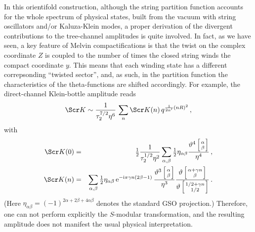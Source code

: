 \documentclass[a4paper,12pt]{article}
\begin{document}
In this orientifold construction, although the string partition 
function accounts for the whole spectrum of
physical states, built from the vacuum with string oscillators and/or
Kaluza-Klein modes, a proper derivation of the divergent contributions to
the tree-channel amplitudes is quite involved. In fact, as we have seen, 
a key feature of Melvin compactifications is that the
twist on the complex coordinate $Z$ is coupled to the number of times the
closed string winds the compact coordinate $y$. This means that each
winding state has a different correpsonding ``twisted sector'', and, as such,
in the partition function the characteristics of the theta-functions 
are shifted accordingly. For example, the direct-channel Klein-bottle
amplitude reads
\begin{equation}
{\Scr K} \sim {1\over \tau_{2}^{7/2} \eta^6} \, \sum_n {\Scr K}
(n) \, q^{{1\over 2\alpha'} (nR)^2}\,,
\end{equation}
with
\begin{eqnarray}
{\Scr K} (0) &=& {\textstyle{1 \over 2}} {1\over \tau_2^{1/2} \eta^2}
\sum_{\alpha,\beta} {\textstyle{1\over 2}} 
\eta_{\alpha\beta} {\vartheta^4 \left[
{\alpha \atop \beta} \right] \over \eta^4} \,,
\nonumber \\
{\Scr K} (n) &=& \sum_{\alpha,\beta} {\textstyle{1\over 2}} \eta_{\alpha\beta}
\, {\rm e}^{-{\rm i}\pi \gamma n (2\beta -1)} \, {\vartheta^3 \left[
{\alpha \atop \beta} \right] \over \eta^3} {\vartheta \left[
{\alpha + \gamma n \atop \beta} \right] \over \vartheta \left[
{1/2 + \gamma n \atop 1/2}\right]} \,.
\end{eqnarray}
(Here $\eta_{\alpha\beta} = (-1) ^{2\alpha +2 \beta + 4 \alpha \beta}$
denotes the standard GSO projection.) Therefore, one can not perform 
explicitly the $S$-modular transformation, and the resulting amplitude does
not manifest the usual physical interpretation. 
\end{document}
